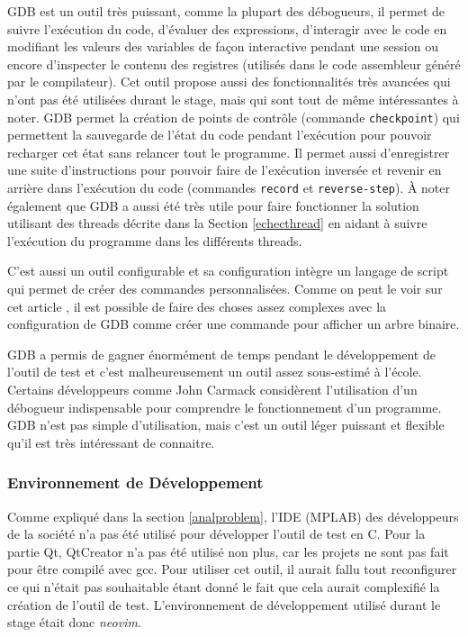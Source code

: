 \documentclass[a4paper]{article}
\begin{document}
GDB est un outil très puissant, comme la plupart des débogueurs, il permet de
suivre l'exécution du code, d'évaluer des expressions, d'interagir avec le code
en modifiant les valeurs des variables de façon interactive pendant une session
ou encore d'inspecter le contenu des registres (utilisés dans le code assembleur
généré par le compilateur). Cet outil propose aussi des fonctionnalités très
avancées qui n'ont pas été utilisées durant le stage, mais qui sont tout de même
intéressantes à noter. GDB permet la création de points de contrôle (commande
\verb|checkpoint|) qui permettent la sauvegarde de l'état du code pendant
l'exécution pour pouvoir recharger cet état sans relancer tout le programme. Il
permet aussi d'enregistrer une suite d'instructions pour pouvoir faire de
l'exécution inversée et revenir en arrière dans l'exécution du code (commandes
\verb|record| et \verb|reverse-step|). À noter également que GDB a aussi été
très utile pour faire fonctionner la solution utilisant des threads décrite dans
la Section \ref{echecthread} en aidant à suivre l'exécution du programme dans
les différents threads.

C'est aussi un outil configurable et sa configuration intègre un langage de
script qui permet de créer des commandes personnalisées. Comme on peut le voir
sur cet article \cite{gdbinit}, il est possible de faire des choses assez
complexes avec la configuration de GDB comme créer une commande pour afficher un
arbre binaire.

GDB a permis de gagner énormément de temps pendant le développement de l'outil
de test et c'est malheureusement un outil assez sous-estimé à l'école. Certains
développeurs comme John Carmack considèrent l'utilisation d'un débogueur
indispensable pour comprendre le fonctionnement d'un programme. GDB n'est pas
simple d'utilisation, mais c'est un outil léger puissant et flexible qu'il est
très intéressant de connaitre.
\subsubsection{Environnement de Développement}%

Comme expliqué dans la section \ref{analproblem}, l'IDE (MPLAB) des développeurs
de la société n'a pas été utilisé pour développer l'outil de test en C. Pour la
partie Qt, QtCreator n'a pas été utilisé non plus, car les projets ne sont pas
fait pour être compilé avec gcc. Pour utiliser cet outil, il aurait fallu tout
reconfigurer ce qui n'était pas souhaitable étant donné le fait que cela aurait
complexifié la création de l'outil de test. L'environnement de développement
utilisé durant le stage était donc \textit{neovim}.
\end{document}
